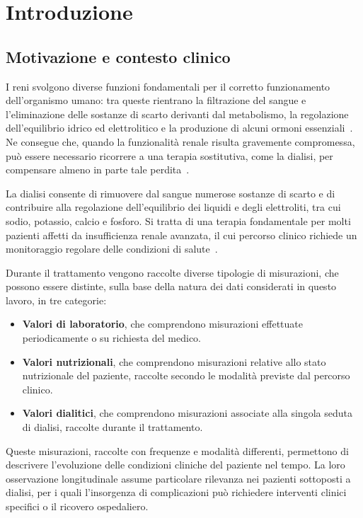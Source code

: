 \documentclass[a4paper,12pt]{report}
\begin{document}
\tableofcontents

\chapter{Introduzione}
\label{cap:introduzione}

\section{Motivazione e contesto clinico}

I reni svolgono diverse funzioni fondamentali per il corretto funzionamento dell'organismo umano: tra queste rientrano la filtrazione del sangue e l'eliminazione delle sostanze di scarto derivanti dal metabolismo, la regolazione dell'equilibrio idrico ed elettrolitico e la produzione di alcuni ormoni essenziali~\cite{ogobuiro2023physiology}. Ne consegue che, quando la funzionalità renale risulta gravemente compromessa, può essere necessario ricorrere a una terapia sostitutiva, come la dialisi, per compensare almeno in parte tale perdita~\cite{LOK2020S1}.

La dialisi consente di rimuovere dal sangue numerose sostanze di scarto e di contribuire alla regolazione dell'equilibrio dei liquidi e degli elettroliti, tra cui sodio, potassio, calcio e fosforo. Si tratta di una terapia fondamentale per molti pazienti affetti da insufficienza renale avanzata, il cui percorso clinico richiede un monitoraggio regolare delle condizioni di salute~\cite{NANOVIC2005}.

Durante il trattamento vengono raccolte diverse tipologie di misurazioni, che possono essere distinte, sulla base della natura dei dati considerati in questo lavoro, in tre categorie:
\begin{itemize}
    \item \textbf{Valori di laboratorio}, che comprendono misurazioni effettuate periodicamente o su richiesta del medico.
    \item \textbf{Valori nutrizionali}, che comprendono misurazioni relative allo stato nutrizionale del paziente, raccolte secondo le modalità previste dal percorso clinico.
    \item \textbf{Valori dialitici}, che comprendono misurazioni associate alla singola seduta di dialisi, raccolte durante il trattamento.
\end{itemize}

Queste misurazioni, raccolte con frequenze e modalità differenti, permettono di descrivere l'evoluzione delle condizioni cliniche del paziente nel tempo. La loro osservazione longitudinale assume particolare rilevanza nei pazienti sottoposti a dialisi, per i quali l'insorgenza di complicazioni può richiedere interventi clinici specifici o il ricovero ospedaliero.
\end{document}
